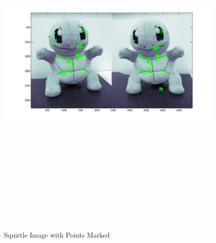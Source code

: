 \documentclass[11pt,psfig]{article}
\begin{document}
\begin{figure}[H]
\centering
\includegraphics[height=7in]{squirtle_prob2Points2.png}
\caption{Squirtle Image with Points Marked}
\label{p2a}
\end{figure}
\end{document}
